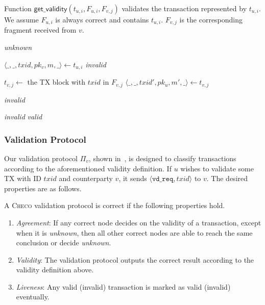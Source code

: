 \begin{algorithm}
\caption{Function $\textsf{get\_validity}(t_{u, i}, F_{u, i}, F_{v, j})$ validates the transaction represented by $t_{u, i}$.
We assume $F_{u, i}$ is always correct and contains $t_{u, i}$.
$F_{v, j}$ is the corresponding fragment received from $v$.}
\label{alg:get-validity}

\begin{algorithmic}

        \State \Return \emph{unknown}
    \EndIf

    \label{line:valid-fragment}
    \State $\langle \_, \_, txid, pk_v, m, \_ \rangle \gets t_{u, i}$
        \State \Return \emph{invalid}
    \EndIf

    \State $t_{v, j} \gets $ the TX block with $txid$ in $F_{v, j}$
    \State $\langle \_, \_, txid', pk_u, m', \_ \rangle \gets t_{v, j}$ 

        \State \Return \emph{invalid}
    \EndIf

        \State \Return \emph{invalid}
    \EndIf
    \State \Return \emph{valid}
\end{algorithmic}
\end{algorithm}

\subsubsection{Validation Protocol}
Our validation protocol $\Pi_v$,
shown in~,
is designed to classify transactions according to the aforementioned validity definition.
If $u$ wishes to validate some TX with ID $txid$ and counterparty $v$, it sends $\langle \texttt{vd\_req}, txid \rangle$ to $v$.
The desired properties are as follows.
\begin{definition}\label{def:validation}
A \textsc{Checo} validation protocol is correct if the following properties hold.
\begin{enumerate}
    \item \emph{Agreement}:
        If any correct node decides on the validity of a transaction, except when it is \emph{unknown},
        then all other correct nodes are able to reach the same conclusion or decide \emph{unknown}.
    \item \emph{Validity}:
        The validation protocol outputs the correct result
        according to the validity definition above.
    \item \emph{Liveness}:
        Any valid (invalid) transaction is marked as valid (invalid) eventually.
\end{enumerate}
\end{definition}

